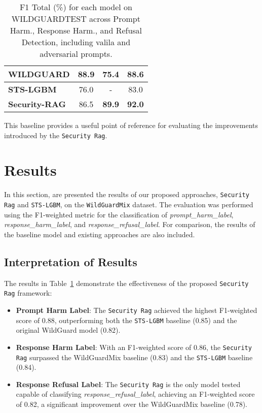 \documentclass{article}
\begin{document}
\begin{itemize}
\begin{itemize}
\begin{table}[h!]
\begin{tabular}{|l|c|c|c|}
WILDGUARD       & \textbf{88.9}                   & 75.4                 & 88.6                        \\ \hline
\textbf{STS-LGBM}        & 76.0    & -     & 83.0   \\ \hline
\textbf{Security-RAG}        & 86.5                   & \textbf{89.9}     &   \textbf{92.0}   \\ \hline
\end{tabular}
\caption{F1 Total (\%) for each model on WILDGUARDTEST across Prompt Harm., Response Harm., and Refusal Detection, including valila and adversarial prompts.} 

\label{tab:f1_totals}
\end{table}

        

    \end{itemize}
\end{itemize}

This baseline provides a useful point of reference for evaluating the improvements introduced by the \texttt{Security Rag}.


\section{Results}

In this section, are presented the results of our proposed approaches, \texttt{Security Rag} and \texttt{STS-LGBM}, on the \texttt{WildGuardMix} dataset. The evaluation was performed using the F1-weighted metric for the classification of \textit{prompt\_harm\_label}, \textit{response\_harm\_label}, and \textit{response\_refusal\_label}. For comparison, the results of the baseline model and existing approaches are also included.


\subsection{Interpretation of Results}

The results in Table~\ref{tab:f1_totals} demonstrate the effectiveness of the proposed \texttt{Security Rag} framework:
\begin{itemize}
    \item \textbf{Prompt Harm Label}: The \texttt{Security Rag} achieved the highest F1-weighted score of 0.88, outperforming both the \texttt{STS-LGBM} baseline (0.85) and the original WildGuard model (0.82).
    \item \textbf{Response Harm Label}: With an F1-weighted score of 0.86, the \texttt{Security Rag} surpassed the WildGuardMix baseline (0.83) and the \texttt{STS-LGBM} baseline (0.84).
    \item \textbf{Response Refusal Label}: The \texttt{Security Rag} is the only model tested capable of classifying \textit{response\_refusal\_label}, achieving an F1-weighted score of 0.82, a significant improvement over the WildGuardMix baseline (0.78).
\end{itemize}
\end{document}
